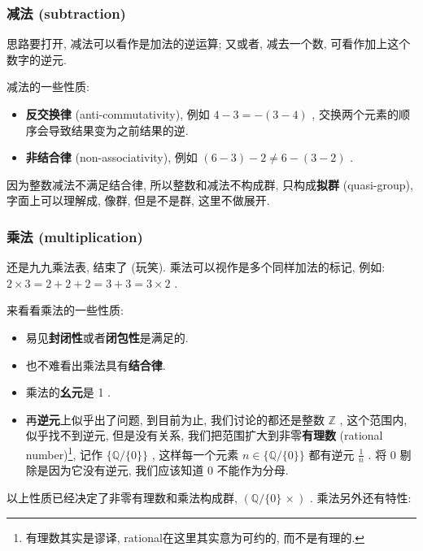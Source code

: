 \hypertarget{ux51cfux6cd5-subtraction}{%
\subsubsection{减法 (subtraction)}\label{ux51cfux6cd5-subtraction}}

思路要打开, 减法可以看作是加法的逆运算; 又或者, 减去一个数,
可看作加上这个数字的逆元.

减法的一些性质:

\begin{itemize}
\tightlist
\item
  \textbf{反交换律} (anti-commutativity), 例如 \(4−3=−(3−4)\) ,
  交换两个元素的顺序会导致结果变为之前结果的逆.
\item
  \textbf{非结合律} (non-associativity), 例如 \((6−3)−2\neq 6−(3−2)\) .
\end{itemize}

因为整数减法不满足结合律, 所以整数和减法不构成群, 只构成\textbf{拟群}
(quasi-group), 字面上可以理解成, 像群, 但是不是群, 这里不做展开.

\hypertarget{ux4e58ux6cd5-multiplication}{%
\subsubsection{乘法
(multiplication)}\label{ux4e58ux6cd5-multiplication}}

还是九九乘法表, 结束了 (玩笑). 乘法可以视作是多个同样加法的标记, 例如:
\(2×3=2+2+2=3+3=3×2\) .

来看看乘法的一些性质:

\begin{itemize}
\tightlist
\item
  易见\textbf{封闭性}或者\textbf{闭包性}是满足的.
\item
  也不难看出乘法具有\textbf{结合律}.
\item
  乘法的\textbf{幺元}是 1 .
\item
  再\textbf{逆元}上似乎出了问题, 到目前为止, 我们讨论的都还是整数
  \(\mathbb{Z}\) , 这个范围内, 似乎找不到逆元, 但是没有关系,
  我们把范围扩大到非零\textbf{有理数} (rational number)\footnote{有理数其实是谬译,
    rational在这里其实意为可约的, 而不是有理的.}, 记作
  \(\{\mathbb{Q}/\{0\}\}\) , 这样每一个元素 \(n\in\{\mathbb{Q}/\{0\}\}\)
  都有逆元 \(\frac{1}{n}\) . 将 \(0\) 剔除是因为它没有逆元, 我们应该知道
  0 不能作为分母.
\end{itemize}

以上性质已经决定了非零有理数和乘法构成群, \((\mathbb{Q}/\{0\}\,×)\) .
乘法另外还有特性:

